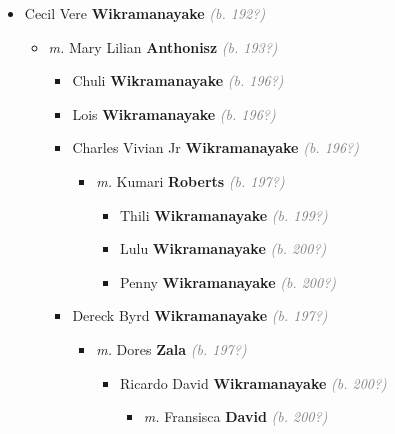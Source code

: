 \documentclass[10pt, openany]{book}
\begin{document}
\begin{itemize}
{\begin{itemize}
{\begin{itemize}
{\begin{itemize}
{ }
\end{itemize}}
\end{itemize}
  }
\item{Cecil Vere \textbf{Wikramanayake} \textcolor{gray}{\textit{(b. 192?)}}
\begin{itemize}
\item{\textit{m.} Mary Lilian \textbf{Anthonisz} \textcolor{gray}{\textit{(b. 193?)}}   \label{couple:00003948:00003949} \begin{itemize}
\item{Chuli \textbf{Wikramanayake} \textcolor{gray}{\textit{(b. 196?)}}
 }
\item{Lois \textbf{Wikramanayake} \textcolor{gray}{\textit{(b. 196?)}}
 }
\item{Charles Vivian Jr \textbf{Wikramanayake} \textcolor{gray}{\textit{(b. 196?)}}
\begin{itemize}
\item{\textit{m.} Kumari \textbf{Roberts} \textcolor{gray}{\textit{(b. 197?)}}   \label{couple:00003952:00003953} \begin{itemize}
\item{Thili \textbf{Wikramanayake} \textcolor{gray}{\textit{(b. 199?)}}
 }
\item{Lulu \textbf{Wikramanayake} \textcolor{gray}{\textit{(b. 200?)}}
 }
\item{Penny \textbf{Wikramanayake} \textcolor{gray}{\textit{(b. 200?)}}
 }
\end{itemize}}
\end{itemize}
   }
\item{Dereck Byrd \textbf{Wikramanayake} \textcolor{gray}{\textit{(b. 197?)}}
\begin{itemize}
\item{\textit{m.} Dores \textbf{Zala} \textcolor{gray}{\textit{(b. 197?)}}   \label{couple:00003958:00003959} \begin{itemize}
\item{Ricardo David \textbf{Wikramanayake} \textcolor{gray}{\textit{(b. 200?)}}
\begin{itemize}
\item{\textit{m.} Fransisca \textbf{David} \textcolor{gray}{\textit{(b. 200?)}}   \label{couple:00003960:00003961} \begin{itemize}

\end{itemize}}
\end{itemize}}
\end{itemize}}
\end{itemize}}
\end{itemize}}
\end{itemize}}
\end{itemize}}
\end{itemize}
\end{document}
